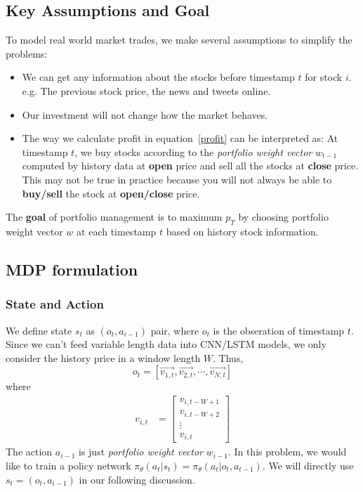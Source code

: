 \documentclass[a4paper, 10pt]{article}
\begin{document}
\begin{spacing}{1.2}
    \subsection{Key Assumptions and Goal}
    To model real world market trades, we make several assumptions to simplify the problems:
    \begin{itemize}
      \item We can get any information about the stocks before timestamp $t$ for stock $i$. e.g. The previous stock price, the news and tweets online.
      \item Our investment will not change how the market behaves.
      \item The way we calculate profit in equation~\ref{profit} can be interpreted as: At timestamp $t$, we buy stocks according to the \emph{portfolio weight vector} $w_{t-1}$ computed by history data at \textbf{open} price and sell all the stocks at \textbf{close} price. This may not be true in practice because you will not always be able to \textbf{buy/sell} the stock at \textbf{open/close} price.
    \end{itemize}
    The \textbf{goal} of portfolio management is to maximum $p_T$ by choosing portfolio weight vector $w$ at each timestamp $t$ based on history stock information.
    
    \subsection{MDP formulation}
    \subsubsection{State and Action}
    We define state $s_t$ as $(o_t, a_{i-1})$ pair, where $o_t$ is the obseration of timestamp $t$. Since we can't feed variable length data into CNN/LSTM models, we only consider the history price in a window length $W$. Thus,
    \begin{equation}
    o_t=[\vec{v_{1,t}},\vec{v_{2,t}},\cdots,\vec{v_{N,t}}]
    \end{equation}
    where
    \begin{align}
    v_{i,t} &=\begin{bmatrix}
    v_{i,t-W+1} \\
    v_{i,t-W+2} \\
    \vdots \\
    v_{i,t}
    \end{bmatrix}
    \end{align}
    The action $a_{i-1}$ is just \emph{portfolio weight vector} $w_{i-1}$. In this problem, we would like to train a policy network $\pi_{\theta}(a_t|s_t)=\pi_{\theta}(a_t|o_t,a_{t-1})$. We will directly use $s_t=(o_t, a_{i-1})$ in our following discussion.\\

\end{spacing}
\end{document}
